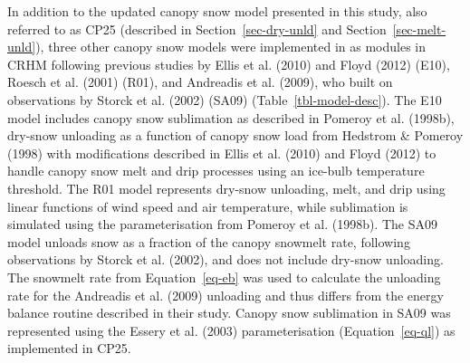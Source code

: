 \documentclass[
]{agujournal2019}
\begin{document}
In addition to the updated canopy snow model presented in this study,
also referred to as CP25 (described in Section~\ref{sec-dry-unld} and
Section~\ref{sec-melt-unld}), three other canopy snow models were
implemented in as modules in CRHM following previous studies by Ellis et
al. (2010) and Floyd (2012) (E10), Roesch et al. (2001) (R01), and
Andreadis et al. (2009), who built on observations by Storck et al.
(2002) (SA09) (Table~\ref{tbl-model-desc}). The E10 model includes
canopy snow sublimation as described in Pomeroy et al. (1998b), dry-snow
unloading as a function of canopy snow load from Hedstrom \& Pomeroy
(1998) with modifications described in Ellis et al. (2010) and Floyd
(2012) to handle canopy snow melt and drip processes using an ice-bulb
temperature threshold. The R01 model represents dry-snow unloading,
melt, and drip using linear functions of wind speed and air temperature,
while sublimation is simulated using the parameterisation from Pomeroy
et al. (1998b). The SA09 model unloads snow as a fraction of the canopy
snowmelt rate, following observations by Storck et al. (2002), and does
not include dry-snow unloading. The snowmelt rate from
Equation~\ref{eq-eb} was used to calculate the unloading rate for the
Andreadis et al. (2009) unloading and thus differs from the energy
balance routine described in their study. Canopy snow sublimation in
SA09 was represented using the Essery et al. (2003) parameterisation
(Equation~\ref{eq-ql}) as implemented in CP25.
\end{document}
